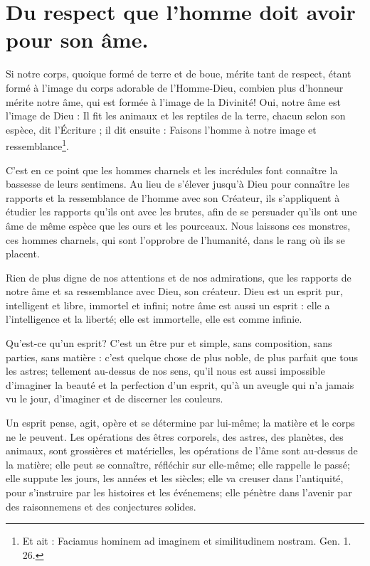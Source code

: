 \documentclass[instructions.tex]{subfiles}
\begin{document}
 
\chapter{Du respect que l’homme doit avoir pour son âme.}
 
Si notre corps, quoique formé de terre et de boue, mérite tant de respect, étant formé à l’image du corps adorable de l’Homme-Dieu, combien plus d’honneur mérite notre âme, qui est formée à l’image de la Divinité! Oui, notre âme est l’image de Dieu : Il fit les animaux et les reptiles de la terre, chacun selon son espèce, dit l’Écriture ; il dit ensuite : Faisons l’homme à notre image et ressemblance\footnote{Et ait : Faciamus hominem ad imaginem et similitudinem nostram. Gen. 1. 26.}.
 
C’est en ce point que les hommes charnels et les incrédules font connaître la bassesse de leurs sentimens. Au lieu de s’élever jusqu’à Dieu pour connaître les rapports et la ressemblance de l’homme avec son Créateur, ils s’appliquent à étudier les rapports qu’ils ont avec les brutes, afin de se persuader qu’ils ont une âme de même espèce que les ours et les pourceaux. Nous laissons ces monstres, ces hommes charnels, qui sont l’opprobre de l’humanité, dans le rang où ils se placent.
 
Rien de plus digne de nos attentions et de nos admirations, que les rapports de notre âme et sa ressemblance avec Dieu, son créateur. Dieu est un esprit pur, intelligent et libre, immortel et infini; notre âme est aussi un esprit : elle a l’intelligence et la liberté; elle est immortelle, elle est comme infinie.
 
\primo Qu’est-ce qu’un esprit? C’est un être pur et simple, sans composition, sans parties, sans matière : c’est quelque chose de plus noble, de plus parfait que tous les astres; tellement au-dessus de nos sens, qu’il nous est aussi impossible d’imaginer la beauté et la perfection d’un esprit, qu’à un aveugle qui n’a jamais vu le jour, d’imaginer et de discerner les couleurs.
 
Un esprit pense, agit, opère et se détermine par lui-même; la matière et le corps ne le peuvent. Les opérations des êtres corporels, des astres, des planètes, des animaux, sont grossières et matérielles, les opérations de l’âme sont au-dessus de la matière; elle peut se connaître, réfléchir sur elle-même; elle rappelle le passé; elle suppute les jours, les années et les siècles; elle va creuser dans l’antiquité, pour s’instruire par les histoires et les événemens; elle pénètre dans l’avenir par des raisonnemens et des conjectures solides.
 
\end{document}
